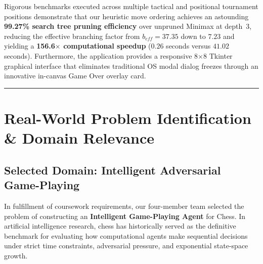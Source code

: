 \documentclass[11pt,a4paper]{article}
\begin{document}
Rigorous benchmarks executed across multiple tactical and positional tournament positions demonstrate that our heuristic move ordering achieves an astounding \textbf{99.27\% search tree pruning efficiency} over unpruned Minimax at depth~3, reducing the effective branching factor from $b_{eff} = 37.35$ down to $7.23$ and yielding a \textbf{156.6$\times$ computational speedup} ($0.26$ seconds versus $41.02$ seconds). Furthermore, the application provides a responsive 8$\times$8 Tkinter graphical interface that eliminates traditional OS modal dialog freezes through an innovative in-canvas Game Over overlay card.

\vspace{0.4cm}
\hrule
\vspace{0.4cm}

\tableofcontents
\newpage

\setcounter{page}{1}

\section{Real-World Problem Identification \& Domain Relevance}

\subsection{Selected Domain: Intelligent Adversarial Game-Playing}
In fulfillment of coursework requirements, our four-member team selected the problem of constructing an \textbf{Intelligent Game-Playing Agent} for Chess. In artificial intelligence research, chess has historically served as the definitive benchmark for evaluating how computational agents make sequential decisions under strict time constraints, adversarial pressure, and exponential state-space growth.
\end{document}
